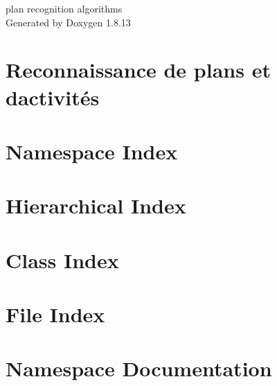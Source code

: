 \documentclass[twoside]{book}
\newcommand{\+}{\discretionary{\mbox{\scriptsize$\hookleftarrow$}}{}{}}
\newcommand{\clearemptydoublepage}{%
  \newpage{\pagestyle{empty}\cleardoublepage}%
}
\begin{document}
\begin{titlepage}
\vspace*{7cm}
\begin{center}%
{\Large plan recognition algorithms }\\
\vspace*{1cm}
{\large Generated by Doxygen 1.8.13}\\
\end{center}
\end{titlepage}
\clearemptydoublepage
{}
\tableofcontents
\clearemptydoublepage
{}

\chapter{Reconnaissance de plans et d\textquotesingle{}activités}
\label{md__r_e_a_d_m_e}

\chapter{Namespace Index}

\chapter{Hierarchical Index}

\chapter{Class Index}

\chapter{File Index}

\chapter{Namespace Documentation}

\end{document}
